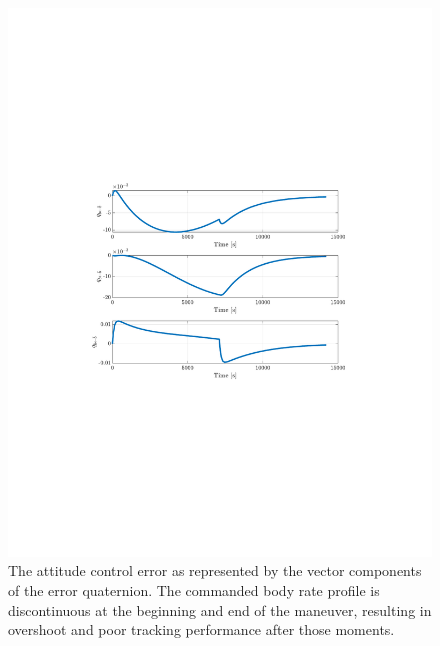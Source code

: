 \documentclass[]{article}
\begin{document}
\begin{figure}[!h]
	\centering
	\includegraphics[width=\linewidth,trim={4cm, 8cm, 4cm, 8cm},clip]{figs/P2Q1.pdf}
	\caption{The attitude control error as represented by the vector components of the error quaternion. The commanded body rate profile is discontinuous at the beginning and end of the maneuver, resulting in overshoot and poor tracking performance after those moments.}
	\label{fig:P2Q1}
\end{figure}
\end{document}
